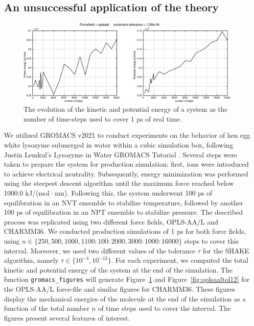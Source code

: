 \documentclass[runningheads]{llncs}
\begin{document}
\subsection{An unsuccessful application of the theory}

\begin{figure}
  \centering
  \includegraphics[width=\linewidth]{oplsaaltol04.pdf}
  \caption{The evolution of the kinetic and potential energy of a system as the number of time-steps used to cover $1$ ps of real time.} \label{fig:oplsaaltol04}
\end{figure}


We utilized GROMACS v2021 to conduct experiments on the behavior of hen egg white lysozyme submerged in water within a cubic simulation box, following Justin Lemkul's Lysozyme in Water GROMACS Tutorial \cite{lemkul2019from}. Several steps were taken to prepare the system for production simulation: first, ions were introduced to achieve electrical neutrality. Subsequently, energy minimization was performed using the steepest descent algorithm until the maximum force reached below 1000.0 kJ/(mol·nm). Following this, the system underwent 100 ps of equilibration in an NVT ensemble to stabilize temperature, followed by another 100 ps of equilibration in an NPT ensemble to stabilize pressure. The described process was replicated using two different force fields, OPLS-AA/L and CHARMM36. We conducted production simulations of 1 ps for both force fields, using $n \in \{250, 500, 1000, 1100:100:2000, 3000:1000:16000 \}$ steps to cover this interval.
Moreover, we used two different values of the tolerance $\tau$ for the SHAKE algorithm, namely $\tau \in \{10^{-4}, 10^{-12}\}$. 
For each experiment, we computed the total kinetic and potential energy of the system at the end of the simulation.
The function {\tt gromacs\_figures} will generate Figure~\ref{fig:oplsaaltol04} and Figure~\ref{fig:oplsaaltol12} for the OPLS-AA/L force-file and similar figures for CHARMM36. These figures display the mechanical energies of the molecule at the end of the simulation as a function of the total number $n$ of time steps used to cover the interval. The figures present several features of interest.
\end{document}
